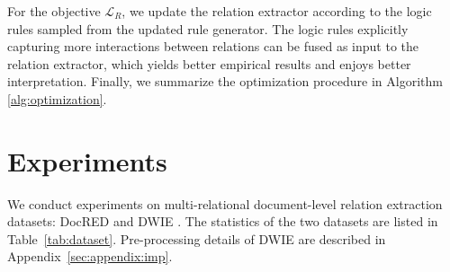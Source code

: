 \documentclass[11pt]{article}
\begin{document}
For the objective $\mathcal{L}_R$, we update the relation extractor according to the logic rules sampled from the updated rule generator. 
The logic rules explicitly capturing more interactions between relations can be fused as input to the relation extractor,
which yields better empirical results and enjoys better interpretation.
Finally, we summarize the optimization procedure in Algorithm \ref{alg:optimization}.










































































 
\section{Experiments}
\label{sec:exp}

We conduct experiments on multi-relational document-level relation extraction datasets: DocRED \cite{yao-etal-2019-docred} and DWIE \cite{zaporojets2020dwie}. The statistics of the two datasets are listed in Table~\ref{tab:dataset}. Pre-processing details of DWIE are described in Appendix~\ref{sec:appendix:imp}.
\end{document}
